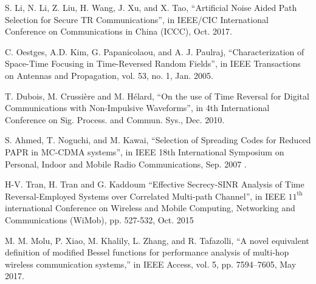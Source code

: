 \documentclass[conference]{IEEEtran}
\begin{document}
\begin{thebibliography}{00}
 S. Li, N. Li, Z. Liu, H. Wang, J. Xu, and X. Tao, ``Artificial Noise Aided Path Selection for Secure TR Communications'', in IEEE/CIC International Conference on Communications in China (ICCC), Oct. 2017.

 C. Oestges, A.D. Kim, G. Papanicolaou, and A. J. Paulraj, ``Characterization of Space-Time Focusing in Time-Reversed Random Fields'', in IEEE Transactions on Antennas and Propagation, vol. 53, no. 1, Jan. 2005.



 T. Dubois, M. Crussi\`{e}re and M.   H\'{e}lard, ``On the use of Time Reversal for Digital Communications with Non-Impulsive Waveforms'', in 4th International Conference on Sig. Process. and Commun. Sys., Dec. 2010.
 

  S. Ahmed, T. Noguchi, and M. Kawai, ``Selection of Spreading Codes for Reduced PAPR in MC-CDMA systems'', in  IEEE 18th International Symposium on Personal, Indoor and Mobile Radio Communications,  Sep. 2007 .

 H-V. Tran, H. Tran and G. Kaddoum
``Effective Secrecy-SINR Analysis of Time Reversal-Employed Systems over Correlated Multi-path Channel'', in IEEE $11^{\text{th}}$ international Conference on Wireless and Mobile Computing, Networking and Communications (WiMob), pp. 527-532, Oct. 2015

 M. M. Molu, P. Xiao, M. Khalily, L. Zhang, and R. Tafazolli, ``A novel equivalent definition of modified Bessel functions for performance
analysis of multi-hop wireless communication systems,'' in IEEE Access,
vol. 5, pp. 7594–7605, May 2017.


\end{thebibliography}
\end{document}
